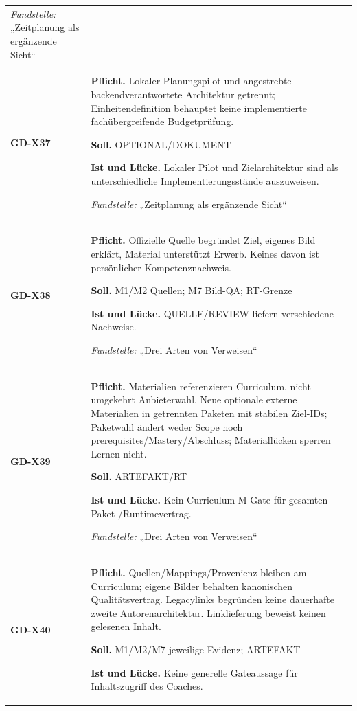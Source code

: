 \begin{longtable}{@{}P{20mm}P{128mm}@{}}
\emph{Fundstelle:} „Zeitplanung als ergänzende Sicht“\\\addlinespace[5pt]
\label{rule:GD-X37}\textbf{GD-X37} &
\textbf{Pflicht.} Lokaler Planungspilot und angestrebte backendverantwortete Architektur getrennt; Einheitendefinition behauptet keine implementierte fachübergreifende Budgetprüfung.\par\smallskip
\textbf{Soll.} OPTIONAL/DOKUMENT\par\smallskip
\textbf{Ist und Lücke.} Lokaler Pilot und Zielarchitektur sind als unterschiedliche Implementierungsstände auszuweisen.\par\smallskip
\emph{Fundstelle:} „Zeitplanung als ergänzende Sicht“\\\addlinespace[5pt]
\label{rule:GD-X38}\textbf{GD-X38} &
\textbf{Pflicht.} Offizielle Quelle begründet Ziel, eigenes Bild erklärt, Material unterstützt Erwerb. Keines davon ist persönlicher Kompetenznachweis.\par\smallskip
\textbf{Soll.} M1/M2 Quellen; M7 Bild-QA; RT-Grenze\par\smallskip
\textbf{Ist und Lücke.} QUELLE/REVIEW liefern verschiedene Nachweise.\par\smallskip
\emph{Fundstelle:} „Drei Arten von Verweisen“\\\addlinespace[5pt]
\label{rule:GD-X39}\textbf{GD-X39} &
\textbf{Pflicht.} Materialien referenzieren Curriculum, nicht umgekehrt Anbieterwahl. Neue optionale externe Materialien in getrennten Paketen mit stabilen Ziel-IDs; Paketwahl ändert weder Scope noch prerequisites/Mastery/Abschluss; Materiallücken sperren Lernen nicht.\par\smallskip
\textbf{Soll.} ARTEFAKT/RT\par\smallskip
\textbf{Ist und Lücke.} Kein Curriculum-M-Gate für gesamten Paket-/Runtimevertrag.\par\smallskip
\emph{Fundstelle:} „Drei Arten von Verweisen“\\\addlinespace[5pt]
\label{rule:GD-X40}\textbf{GD-X40} &
\textbf{Pflicht.} Quellen/Mappings/Provenienz bleiben am Curriculum; eigene Bilder behalten kanonischen Qualitätsvertrag. Legacylinks begründen keine dauerhafte zweite Autorenarchitektur. Linklieferung beweist keinen gelesenen Inhalt.\par\smallskip
\textbf{Soll.} M1/M2/M7 jeweilige Evidenz; ARTEFAKT\par\smallskip
\textbf{Ist und Lücke.} Keine generelle Gateaussage für Inhaltszugriff des Coaches.\par\smallskip

\end{longtable}
